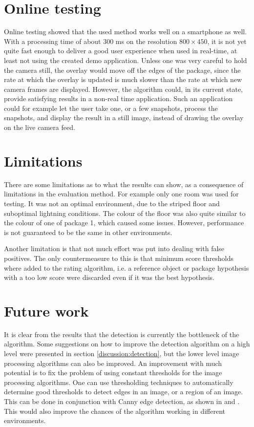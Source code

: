 \section{Online testing} %
Online testing showed that the used method works well on a smartphone as well.
With a processing time of about 300 ms on the resolution $800 \times 450$, it is not yet quite fast enough to deliver a good user experience when used in real-time, at least not using the created demo application.
Unless one was very careful to hold the camera still, the overlay would move off the edges of the package, since the rate at which the overlay is updated is much slower than the rate at which new camera frames are displayed.
However, the algorithm could, in its current state, provide satisfying results in a non-real time application.
Such an application could for example let the user take one, or a few snapshots, process the snapshots, and display the result in a still image, instead of drawing the overlay on the live camera feed.

\section{Limitations}
There are some limitations as to what the results can show, as a consequence of limitations in the evaluation method.
For example only one room was used for testing.
It was not an optimal environment, due to the striped floor and suboptimal lightning conditions.
The colour of the floor was also quite similar to the colour of one of package 1, which caused some issues.
However, performance is not guaranteed to be the same in other environments.

Another limitation is that not much effort was put into dealing with false positives.
The only countermeasure to this is that minimum score thresholds where added to the rating algorithm, i.e. a reference object or package hypothesis with a too low score were discarded even if it was the best hypothesis.

\section{Future work} \label{discussion:future_work}
It is clear from the results that the detection is currently the bottleneck of the algorithm.
Some suggestions on how to improve the detection algorithm on a high level were presented in section \ref{discussion:detection}, but the lower level image processing algorithms can also be improved.
An improvement with much potential is to fix the problem of using constant thresholds for the image processing algorithms.
One can use thresholding techniques to automatically determine good thresholds to detect edges in an image, or a region of an image.
This can be done in conjunction with Canny edge detection, as shown in \cite{wang2005fast} and \cite{liu2004automated}.
This would also improve the chances of the algorithm working in different environments.

